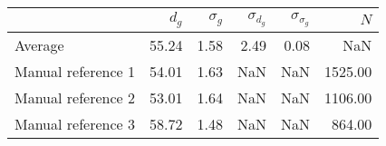 \begin{tabular}{lrrrrr}
\toprule
{} &  $d_g$ &  $\sigma_g$ &  $\sigma_{d_g}$ &  $\sigma_{\sigma_g}$ &     $N$ \\
\midrule
Average            &  55.24 &        1.58 &            2.49 &                 0.08 &     NaN \\
Manual reference 1 &  54.01 &        1.63 &             NaN &                  NaN & 1525.00 \\
Manual reference 2 &  53.01 &        1.64 &             NaN &                  NaN & 1106.00 \\
Manual reference 3 &  58.72 &        1.48 &             NaN &                  NaN &  864.00 \\
\bottomrule
\end{tabular}
